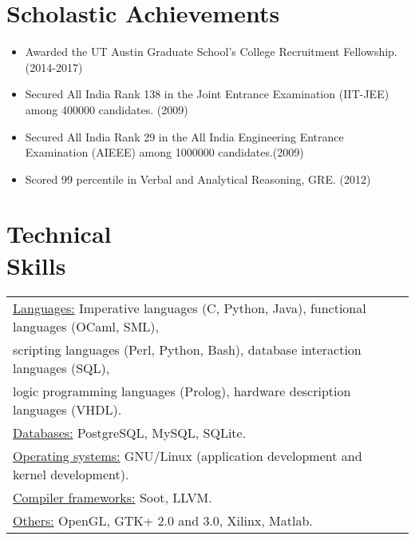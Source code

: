 \documentclass[margin]{res}
\begin{document}
\begin{resume}
\section{Scholastic Achievements}
 \begin{itemize} \itemsep -2pt  %
 \item Awarded the UT Austin Graduate School's College Recruitment
   Fellowship. \hfill (2014-2017)
 \item Secured All India Rank 138 in the Joint Entrance Examination
   (IIT-JEE) among 400000 candidates. \hfill (2009)
 \item Secured All India Rank 29 in the All India Engineering Entrance
   Examination (AIEEE) among 1000000 candidates.\hfill (2009)
 \item Scored 99 percentile in Verbal and Analytical Reasoning,
   GRE. \hfill (2012)
 \end{itemize}

\section{Technical \\ Skills}
   \begin{tabular}{l p{3in}}
    \underline{Languages:} Imperative languages (C, Python, Java),
    functional languages (OCaml, SML), \\ scripting languages (Perl,
    Python, Bash), database interaction languages (SQL), \\ logic
    programming languages (Prolog), hardware description languages
    (VHDL). \\

    \underline{Databases:} PostgreSQL, MySQL, SQLite. \\

    \underline{Operating systems:} GNU/Linux (application development
    and kernel development). \\

    \underline{Compiler frameworks:} Soot, LLVM. \\

    \underline{Others:} OpenGL, GTK+ 2.0 and 3.0, Xilinx, Matlab. \\
 \end{tabular}

\end{resume} 
\end{document}
